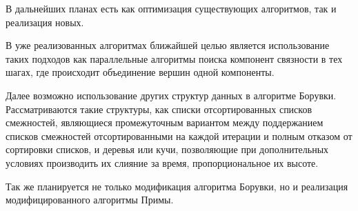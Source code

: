 \documentclass{article}
\begin{document}
В дальнейших планах есть как оптимизация существующих алгоритмов, так и реализация новых.

В уже реализованных алгоритмах ближайшей целью является использование таких подходов как параллельные алгоритмы поиска компонент связности в тех шагах, где происходит объединение вершин одной компоненты.

Далее возможно использование других  структур данных в алгоритме Борувки. Рассматриваются такие структуры, как списки отсортированных списков смежностей, являющиеся промежуточным вариантом между поддержанием списков смежностей отсортированными на каждой итерации и полным отказом от сортировки списков, и деревья или кучи, позволяющие при дополнительных условиях производить их слияние за время, пропорциональное их высоте.

Так же планируется не только модификация алгоритма Борувки, но и реализация модифицированного алгоритмы Примы.

\newpage


\end{document}
